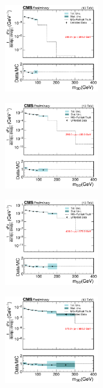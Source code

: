   \begin{figure}[htp!]
    \begin{subfigure}
      \centering
      \includegraphics[width=0.45\textwidth]{figures/multijet/unfolding/dijet/binnedResult_groomed_0.pdf}
    \end{subfigure} 
    \begin{subfigure}
      \centering
      \includegraphics[width=0.45\textwidth]{figures/multijet/unfolding/dijet/binnedResult_groomed_1.pdf}
    \end{subfigure}
    \begin{subfigure}
      \centering
      \includegraphics[width=0.45\textwidth]{figures/multijet/unfolding/dijet/binnedResult_groomed_2.pdf}
    \end{subfigure} 
    \begin{subfigure}
      \centering
      \includegraphics[width=0.45\textwidth]{figures/multijet/unfolding/dijet/binnedResult_groomed_3.pdf}

\end{subfigure}
\end{figure}
